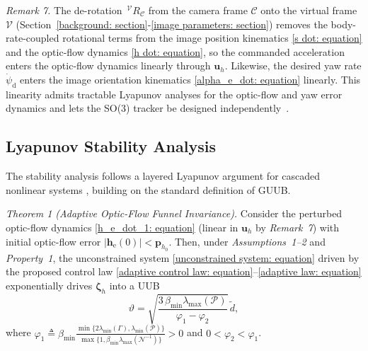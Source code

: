 \textit{Remark 7.} The de-rotation $\,^\mathcal{V}R_\mathcal{C}$ from the camera frame $\mathcal{C}$ onto the virtual frame $\mathcal{V}$ (Section~\ref{background: section}-\ref{image parameters: section}) removes the body-rate-coupled rotational terms from the image position kinematics \eqref{s dot: equation} and the optic-flow dynamics \eqref{h dot: equation}, so the commanded acceleration enters the optic-flow dynamics linearly through $\boldsymbol{u}_h$. Likewise, the desired yaw rate $\dot{\psi}_\text{d}$ enters the image orientation kinematics \eqref{alpha_e_dot: equation} linearly. This linearity admits tractable Lyapunov analyses for the optic-flow and yaw error dynamics and lets the SO(3) tracker be designed independently~\cite{fink2017, xie2016_2}.

\subsection{Lyapunov Stability Analysis} \label{stability: section}
The stability analysis follows a layered Lyapunov argument for cascaded nonlinear systems \cite{khalil2002}, building on the standard definition of GUUB.

\textit{Theorem 1 (Adaptive Optic-Flow Funnel Invariance).}
Consider the perturbed optic-flow dynamics \eqref{h_e_dot_1: equation} (linear in $\boldsymbol{u}_h$ by \textit{Remark~7}) with initial optic-flow error $|\boldsymbol{h}_\text{e}(0)|<\boldsymbol{p}_{h_0}$. Then, under \textit{Assumptions~1--2} and \textit{Property~1}, the unconstrained system \eqref{unconstrained system: equation} driven by the proposed control law \eqref{adaptive control law: equation}--\eqref{adaptive law: equation} exponentially drives $\boldsymbol{\zeta}_h$ into a UUB
\begin{equation} \label{UUB bound: equation}
    \vartheta = \sqrt{\frac{3\,\beta_{\min}\lambda_{\max}(\mathcal{P})}{\varphi_1-\varphi_2}}\,\tilde{d},
\end{equation}
where $\varphi_1 \triangleq \beta_{\min}\frac{\min\{2\lambda_{\min}(\Gamma),\lambda_{\min}(\mathcal{P})\}}{\max\{1,\beta_{\min}\lambda_{\max}(\mathcal{N}^{-1})\}}>0$ and $0<\varphi_2<\varphi_1$.

